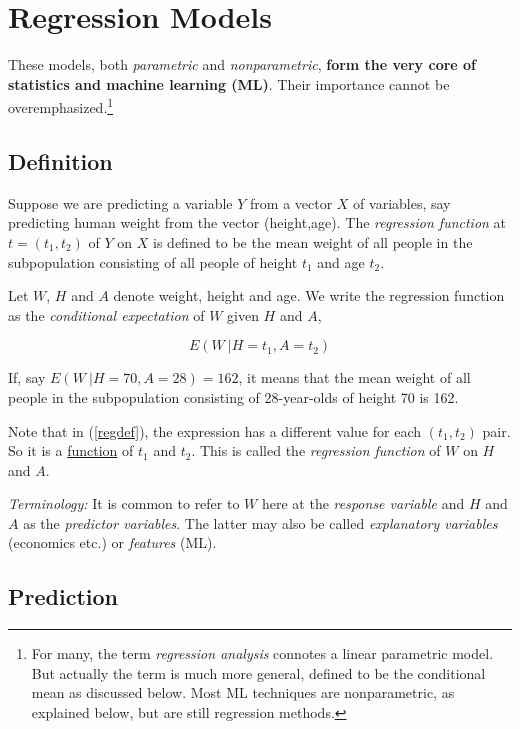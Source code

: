 \section{Regression Models} 

These models, both \textit{parametric} and \textit{nonparametric},
\textbf{form the very core of statistics and machine learning (ML)}.  Their
importance cannot be overemphasized.\footnote{For many, the term
\textit{regression analysis} connotes a linear parametric model.  But
actually the term is much more general, defined to be the conditional
mean as discussed below.  Most ML techniques are nonparametric, as
explained below, but are still regression methods.}

\subsection{Definition}

Suppose we are predicting a variable $Y$ from a vector $X$ of variables,
say predicting human weight from the vector (height,age).  The
\textit{regression function} at $t = (t_1,t_2)$ of $Y$ on $X$ is defined
to be the mean weight of all people in the subpopulation consisting of
all people of height $t_1$ and age $t_2$.

Let $W$, $H$ and $A$ denote weight, height and age.  We write the
regression function as the \textit{conditional expectation} of $W$ given
$H$ and $A$, 

\begin{equation}
\label{regdef}
E(W ~| H=t_1, A=t_2)
\end{equation}

If, say $E(W ~| H=70, A=28) = 162$, it means that the mean weight of all
people in the subpopulation consisting of 28-year-olds of height 70 is
162.

Note that in (\ref{regdef}), the expression has a different value for
each $(t_1,t_2)$ pair.  So it is a \underline{function} of $t_1$ and
$t_2$.  This is called the \textit{regression function} of $W$ on $H$
and $A$.

\textit{Terminology:} It is common to refer to $W$ here at the
\textit{response variable} and $H$ and $A$ as the \textit{predictor
variables}.  The latter may also be called \textit{explanatory
variables} (economics etc.) or \textit{features} (ML).

\subsection{Prediction}

